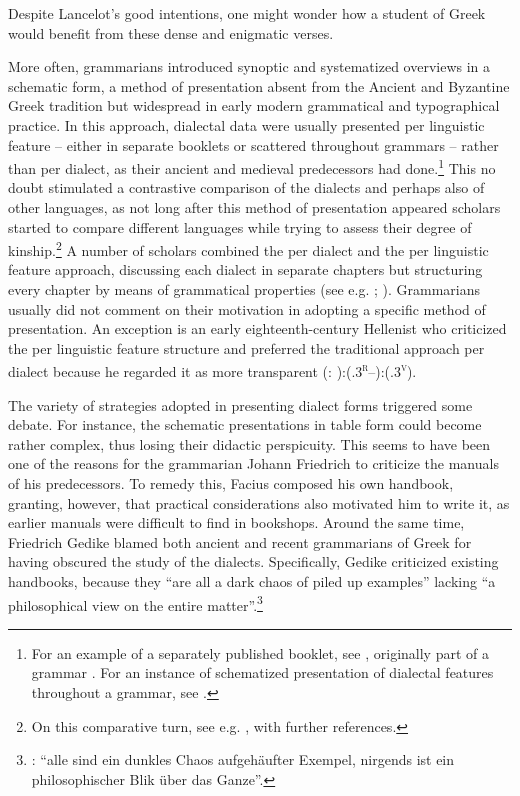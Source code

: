 Despite Lancelot’s good intentions, one might wonder how a student of Greek would benefit from these dense and enigmatic verses.

More often, grammarians introduced synoptic and systematized overviews in a schematic form, a method of presentation absent from the Ancient and Byzantine Greek tradition but widespread in early modern grammatical and typographical practice. In this approach, dialectal data were usually presented per linguistic feature – either in separate booklets or scattered throughout grammars – rather than per dialect, as their ancient and medieval predecessors had done.\footnote{For an example of a separately published booklet, see \citet{Amerot1530}, originally part of a grammar \citep{Amerot1520}. For an instance of schematized presentation of dialectal features throughout a grammar, see \citet{Gretser1593}.} This no doubt stimulated a contrastive comparison of the dialects and perhaps also of other languages, as not long after this method of presentation appeared scholars started to compare different languages while trying to assess their degree of kinship.\footnote{On this comparative turn, see e.g. \citet{Considine2010b}, with further references.} A number of scholars combined the per dialect and the per linguistic feature approach, discussing each dialect in separate chapters but structuring every chapter by means of grammatical properties (see e.g. \citealt{Zwinger1605}; \citealt{Merigon1621}). Grammarians usually did not comment on their motivation in adopting a specific method of presentation. An exception is an early eighteenth-century Hellenist who criticized the per linguistic feature structure and preferred the traditional approach per dialect because he regarded it as more transparent (\citealt{Heupel1712}: ):(.3\textsc{\textsuperscript{r}–}):(.3\textsc{\textsuperscript{v}}).

The variety of strategies adopted in presenting dialect forms triggered some debate. For instance, the schematic presentations in table form could become rather complex, thus losing their didactic perspicuity. This seems to have been one of the reasons for the grammarian Johann Friedrich \citet[\textsc{viii}]{Facius1782} to criticize the manuals of his predecessors. To remedy this, Facius composed his own handbook, granting, however, that practical considerations also motivated him to write it, as earlier manuals were difficult to find in bookshops. Around the same time, Friedrich Gedike blamed both ancient and recent grammarians of Greek for having obscured the study of the dialects. Specifically, Gedike criticized existing handbooks, because they “are all a dark chaos of piled up examples” lacking “a philosophical view on the entire matter”.\footnote{\citet[4]{Gedike1782}: “alle sind ein dunkles Chaos aufgehäufter Exempel, nirgends ist ein philosophischer Blik über das Ganze”.}

